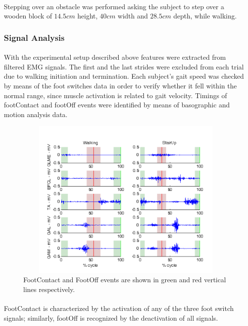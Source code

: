 \documentclass[12pt]{article}
\begin{document}
\paragraph{}
Stepping over an obstacle was performed asking the subject to step over a wooden block of $14.5 cm$ height, $40 cm$ width and $28.5 cm$ depth, while walking.

\subsubsection{Signal Analysis}
\paragraph{}
With the experimental setup described above features were extracted from filtered EMG signals. The first and the last strides were excluded from each trial due to walking initiation and termination. Each subject’s gait speed was checked by means of the foot switches data in order to verify whether it fell within the normal range, since muscle activation is related to gait velocity. Timings of footContact and footOff events were identified by means of basographic and motion analysis data.

\begin{figure}[h]
	\begin{center}
		\includegraphics[height=8cm,width=12cm]{Signals}
	\end{center}
	\caption{FootContact and FootOff events are shown in green and red vertical lines respectively.}
\end{figure}

\paragraph{}
FootContact is characterized by the activation of any of the three foot switch signals; similarly, footOff is recognized by the deactivation of all signals.
\end{document}
